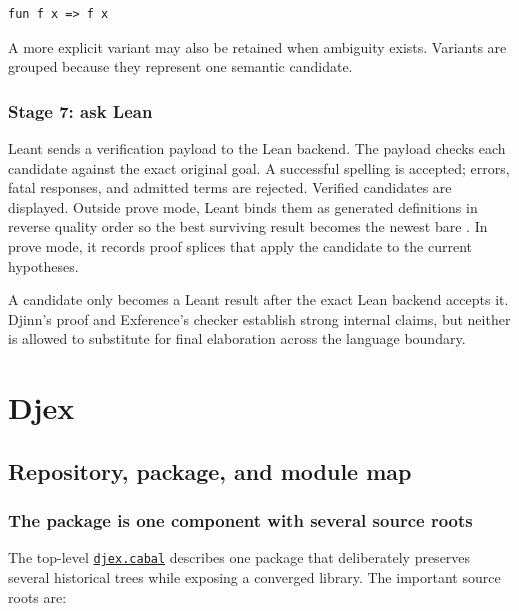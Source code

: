 \documentclass[10pt,letterpaper,oneside]{report}
\newcommand{\code}[1]{\texttt{\detokenize{#1}}}
\def\DjexBase{https://github.com/VladimirReshetnikov/Djex/blob/e454757d53ec057238c22fc6cd0d935b7d96b3dc/}
\newcommand{\dpath}[1]{\href{\DjexBase#1}{\nolinkurl{#1}}}
\begin{document}
\begin{lstlisting}[language=Leanish]
fun f x => f x
\end{lstlisting}

A more explicit variant may also be retained when ambiguity exists. Variants are grouped because they represent one semantic candidate.

\section{Stage 7: ask Lean}

Leant sends a verification payload to the Lean backend. The payload checks each candidate against the exact original goal. A successful spelling is accepted; errors, fatal responses, and admitted terms are rejected. Verified candidates are displayed. Outside prove mode, Leant binds them as generated definitions in reverse quality order so the best surviving result becomes the newest bare \code{it}. In prove mode, it records proof splices that apply the candidate to the current hypotheses.

\begin{invariantbox}
A candidate only becomes a Leant result after the exact Lean backend accepts it. Djinn's proof and Exference's checker establish strong internal claims, but neither is allowed to substitute for final elaboration across the language boundary.
\end{invariantbox}

\part{Djex}

\chapter{Repository, package, and module map}\label{ch:djex-map}

\section{The package is one component with several source roots}

The top-level \dpath{djex.cabal} describes one package that deliberately preserves several historical trees while exposing a converged library. The important source roots are:
\end{document}
